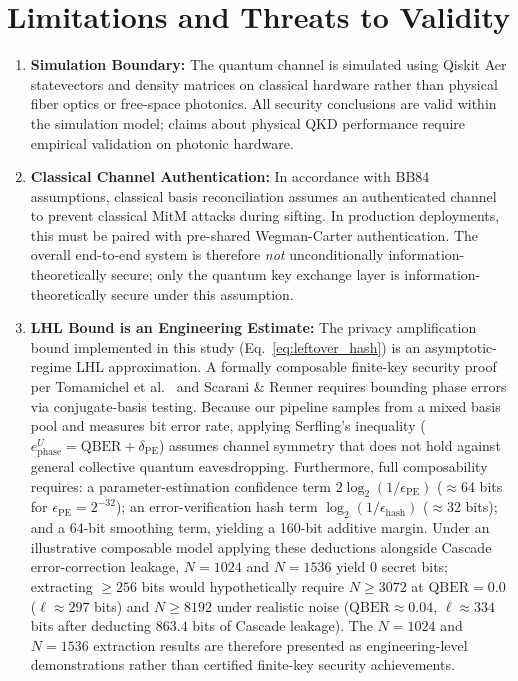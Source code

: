 \documentclass[journal,10pt,twocolumn]{article}
\begin{document}
\section{Limitations and Threats to Validity}
\label{sec:limitations}
\begin{enumerate}
    \item \textbf{Simulation Boundary:} The quantum channel is simulated using Qiskit Aer statevectors and density matrices on classical hardware rather than physical fiber optics or free-space photonics. All security conclusions are valid within the simulation model; claims about physical QKD performance require empirical validation on photonic hardware.
    \item \textbf{Classical Channel Authentication:} In accordance with BB84 assumptions, classical basis reconciliation assumes an authenticated channel to prevent classical MitM attacks during sifting. In production deployments, this must be paired with pre-shared Wegman-Carter authentication. The overall end-to-end system is therefore \emph{not} unconditionally information-theoretically secure; only the quantum key exchange layer is information-theoretically secure under this assumption.
    \item \textbf{LHL Bound is an Engineering Estimate:} The privacy amplification bound implemented in this study (Eq.~\ref{eq:leftover_hash}) is an asymptotic-regime LHL approximation. A formally composable finite-key security proof per Tomamichel et al.\ \cite{tomamichel2012tight} and Scarani \& Renner \cite{scarani2008quantum} requires bounding phase errors via conjugate-basis testing. Because our pipeline samples from a mixed basis pool and measures bit error rate, applying Serfling's inequality ($e_{\text{phase}}^U = \text{QBER} + \delta_{\text{PE}}$) assumes channel symmetry that does not hold against general collective quantum eavesdropping. Furthermore, full composability requires: a parameter-estimation confidence term $2\log_2(1/\epsilon_{\text{PE}})$ ($\approx$64 bits for $\epsilon_{\text{PE}}=2^{-32}$); an error-verification hash term $\log_2(1/\epsilon_{\text{hash}})$ ($\approx$32 bits); and a 64-bit smoothing term, yielding a 160-bit additive margin. Under an illustrative composable model applying these deductions alongside Cascade error-correction leakage, $N=1024$ and $N=1536$ yield 0 secret bits; extracting $\ge 256$ bits would hypothetically require $N \ge 3072$ at $\text{QBER}=0.0$ ($\ell \approx 297$ bits) and $N \ge 8192$ under realistic noise ($\text{QBER} \approx 0.04$, $\ell \approx 334$ bits after deducting $863.4$ bits of Cascade leakage). The $N=1024$ and $N=1536$ extraction results are therefore presented as engineering-level demonstrations rather than certified finite-key security achievements.

\end{enumerate}
\end{document}
